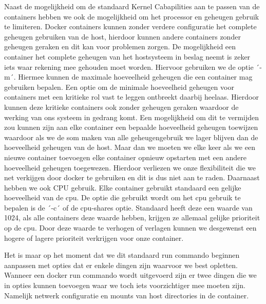 Naast de mogelijkheid om de standaard Kernel Cabapilities aan te passen van de containers hebben we ook de mogelijkheid om het processor en geheugen gebruik te limiteren. Docker containers kunnen zonder verdere configuratie het complete geheugen gebruiken van de host, hierdoor kunnen andere containers zonder geheugen geraken en dit kan voor problemen zorgen. De mogelijkheid een container het complete geheugen van het hostsysteem in beslag neemt is zeker iets waar rekening mee gehouden moet worden. Hiervoor gebruiken we de optie ´-m´. Hiermee kunnen de maximale hoeveelheid geheugen die een container mag gebruiken bepalen. Een optie om de minimale hoeveelheid geheugen voor containers met een kritieke rol vast te leggen ontbreekt daarbij heelaas. Hierdoor kunnen deze kritieke containers ook zonder geheugen geraken waardoor de werking van ons systeem in gedrang komt. Een mogelijkheid om dit te vermijden zou kunnen zijn aan elke container een bepaalde hoeveelheid geheugen toewijzen waardoor als we de som maken van alle geheugengebruik we lager blijven dan de hoeveelheid geheugen van de host. Maar dan we moeten we elke keer als we een nieuwe container toevoegen elke container opnieuw opstarten met een andere hoeveelheid geheugen toegewezen. Hierdoor verliezen we onze flexibiliteit die we net verkijgen door docker te gebruiken en dit is dus niet aan te raden. Daarnaast hebben we ook CPU gebruik. Elke container gebruikt standaard een gelijke hoeveelheid van de cpu. De optie die gebruikt wordt om het cpu gebruik te bepalen is de ´-c´ of de cpu-shares optie. Standaard heeft deze een waarde van 1024, als alle containers deze waarde hebben, krijgen ze allemaal gelijke prioriteit op de cpu. Door deze waarde te verhogen of verlagen kunnen we desgewenst een hogere of lagere prioriteit verkrijgen voor onze container. 

Het is maar op het moment dat we dit standaard run commando beginnen aanpassen met opties dat er enkele dingen zijn waarvoor we best opletten. Wanneer een docker run commando wordt uitgevoerd zijn er twee dingen die we in opties kunnen toevoegen waar we toch iets voorzichtiger mee moeten zijn. Namelijk netwerk configuratie en mounts van host directories in de container.

